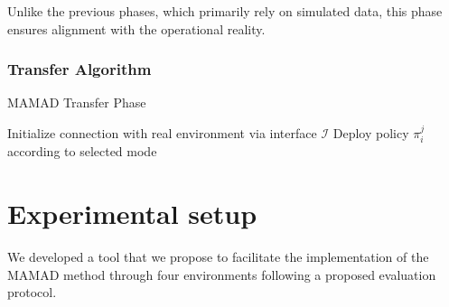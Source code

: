 \documentclass[pdflatex,sn-mathphys-num]{sn-jnl}%
\theoremstyle{thmstyleone}%
\theoremstyle{thmstyletwo}%
\theoremstyle{thmstylethree}%
\begin{document}
Unlike the previous phases, which primarily rely on simulated data, this phase ensures alignment with the operational reality.

\subsubsection*{Transfer Algorithm}

\begin{algorithm}[H]
    \caption{MAMAD Transfer Phase}
    \label{alg:transferring}
    \DontPrintSemicolon
    
    Initialize connection with real environment via interface $\mathcal{I}$\;
    Deploy policy $\pi^j_i$ according to selected mode\;
    
\end{algorithm}

\section{Experimental setup}
\label{sec:experimental_setup}

We developed a tool that we propose to facilitate the implementation of the MAMAD method through four environments following a proposed evaluation protocol.


\end{document}
